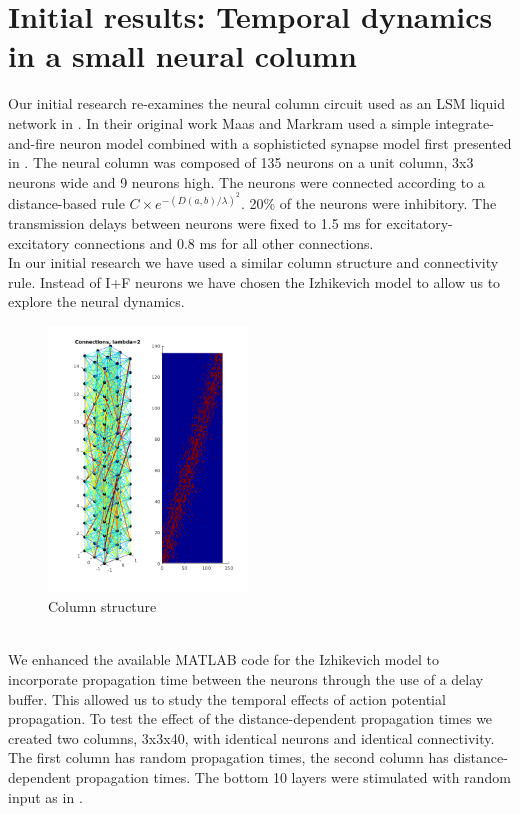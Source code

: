 \documentclass[a4paper,11pt]{article}
\begin{document}
\section{Initial results: Temporal dynamics in a small neural column}
Our initial research re-examines the neural column circuit used as an LSM liquid network in \cite{maas2002}.
In their original work Maas and Markram used a simple integrate-and-fire neuron model combined with a sophisticted synapse model first presented in \cite{markram1998}.
The neural column was composed of 135 neurons on a unit column, 3x3 neurons wide and 9 neurons high.
The neurons were connected according to a distance-based rule $C \times e^{-(D(a,b)/\lambda)^2} $.
20\% of the neurons were inhibitory. 
The transmission delays between neurons were fixed to 1.5 ms for excitatory-excitatory connections and 0.8 ms for all other connections.
\\
In our initial research we have used a similar column structure and connectivity rule. 
Instead of I+F neurons we have chosen the Izhikevich model \cite{izhikevich2003} to allow us to explore the neural dynamics.
\\
\begin{figure}[ht]
 \caption{Column structure}
 \centering
   \includegraphics[width=200px]{fig/lambda2}
\end{figure}
\\
We enhanced the available MATLAB code for the Izhikevich model to incorporate propagation time between the neurons through the use of a delay buffer.
This allowed us to study the temporal effects of action potential propagation.
To test the effect of the distance-dependent propagation times we created two columns, 3x3x40,  with identical neurons and identical connectivity.
The first column has random propagation times, the second column has distance-dependent propagation times.
The bottom 10 layers were stimulated with random input as in \cite{izhikevich2003}.
\end{document}

